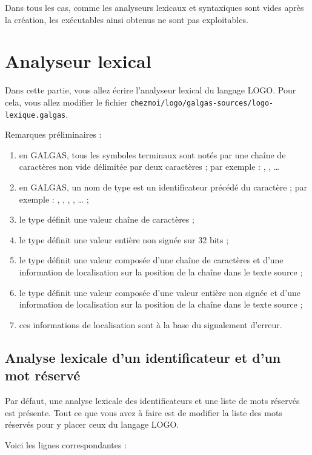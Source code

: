 Dans tous les cas, comme les analyseurs lexicaux et syntaxiques sont vides après la création, les exécutables ainsi obtenus ne sont pas exploitables.


\section {Analyseur lexical}


Dans cette partie, vous allez écrire l’analyseur lexical du langage LOGO. Pour cela, vous allez modifier le fichier \texttt{chezmoi/logo/galgas-sources/logo-lexique.galgas}.

Remarques préliminaires :
\begin{enumerate}
  \item en GALGAS, tous les symboles terminaux sont notés par une chaîne de caractères non vide délimitée par deux caractères \galgas{$} ; par exemple : , , … 
  \item en GALGAS, un nom de type est un identificateur précédé du caractère  ; par exemple : , , , , … ;
  \item le type  définit une valeur chaîne de caractères ;
  \item le type  définit une valeur entière non signée sur 32 bits ;
  \item le type  définit une valeur composée d'une chaîne de caractères et d'une information de localisation sur la position de la chaîne dans le texte source ;
  \item le type  définit une valeur composée d'une valeur entière non signée et d'une information de localisation sur la position de la chaîne dans le texte source ;
  \item ces informations de localisation sont à la base du signalement d'erreur.
\end{enumerate}

\subsection{Analyse lexicale d'un identificateur et d'un mot réservé}

Par défaut, une analyse lexicale des identificateurs et une liste de mots réservés est présente. Tout ce que vous avez à faire est de modifier la liste des mots réservés pour y placer ceux du langage LOGO.

Voici les lignes correspondantes :

